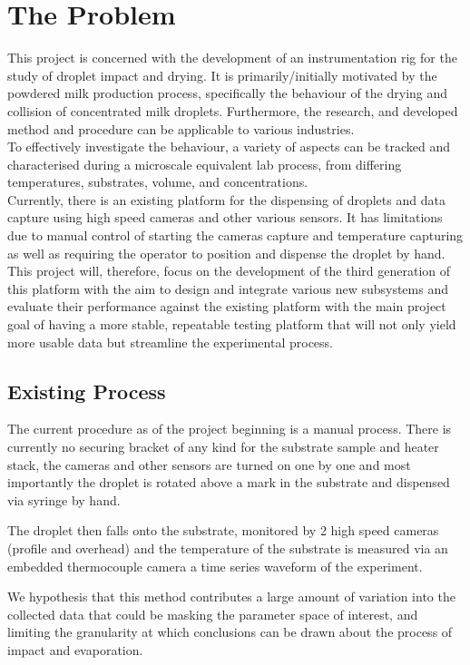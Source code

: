 \documentclass[11pt, a4paper, twoside, openright]{report}
\begin{document}
\section{The Problem}
This project is concerned with the development of an instrumentation rig for the study of droplet impact and drying. It is primarily/initially motivated by the powdered milk production process, specifically the behaviour of the drying and collision of concentrated milk droplets. Furthermore, the research, and developed method and procedure can be applicable to various industries. \\

To effectively investigate the behaviour, a variety of aspects can be tracked and characterised during a microscale equivalent lab process, from differing temperatures, substrates, volume, and concentrations. \\

Currently, there is an existing platform for the dispensing of droplets and data capture using high speed cameras and other various sensors. It has limitations due to manual control of starting the cameras capture and temperature capturing as well as requiring the operator to position and dispense the droplet by hand. \\

This project will, therefore, focus on the development of the third generation of this platform with the aim to design and integrate various new subsystems and evaluate their performance against the existing platform with the main project goal of having a more stable, repeatable testing platform that will not only yield more usable data but streamline the experimental process.

\subsection{Existing Process}
The current procedure as of the project beginning is a manual process. There is currently no securing bracket of any kind for the substrate sample and heater stack, the cameras and other sensors are turned on one by one and most importantly the droplet is rotated above a mark in the substrate and dispensed via syringe by hand.

The droplet then falls onto the substrate, monitored by 2 high speed cameras (profile and overhead) and the temperature of the substrate is measured via an embedded thermocouple camera a time series waveform of the experiment.

We hypothesis that this method contributes a large amount of variation into the collected data that could be masking the parameter space of interest, and limiting the granularity at which conclusions can be drawn about the process of impact and evaporation.
\end{document}

